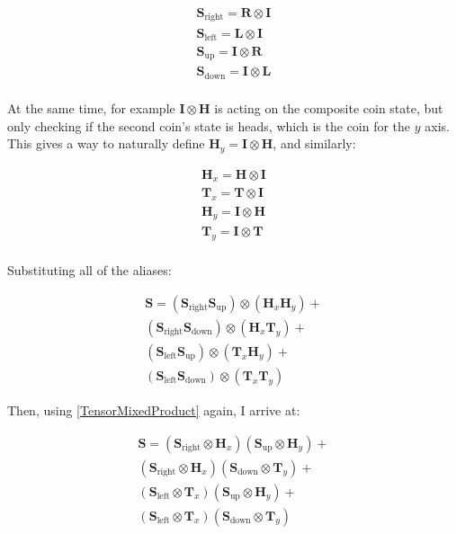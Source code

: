 \begin{align*} 
\mathbf{S}_{\text{right}} = \mathbf{R} \otimes \mathbf{I} \\
\mathbf{S}_{\text{left}} = \mathbf{L} \otimes \mathbf{I} \\
\mathbf{S}_{\text{up}} = \mathbf{I} \otimes \mathbf{R} \\
\mathbf{S}_{\text{down}} = \mathbf{I} \otimes \mathbf{L} \\
\end{align*}

At the same time, for example $\mathbf{I} \otimes \mathbf{H}$ is acting on the composite coin state, but only checking if the second coin's state is heads, which is the coin for the $y$ axis. This gives a way to naturally define $\mathbf{H}_y = \mathbf{I} \otimes \mathbf{H}$, and similarly:

\begin{align*} 
\mathbf{H}_x = \mathbf{H} \otimes \mathbf{I} \\
\mathbf{T}_x = \mathbf{T} \otimes \mathbf{I} \\
\mathbf{H}_y = \mathbf{I} \otimes \mathbf{H} \\
\mathbf{T}_y = \mathbf{I} \otimes \mathbf{T} \\
\end{align*}

Substituting all of the aliases:

\begin{align*} 
    \mathbf{S} =   
    (\mathbf{S}_{\text{right}}\mathbf{S}_{\text{up}}) \otimes (\mathbf{H}_x\mathbf{H}_y) + \\
    (\mathbf{S}_{\text{right}}\mathbf{S}_{\text{down}}) \otimes (\mathbf{H}_x\mathbf{T}_y) + \\
    (\mathbf{S}_{\text{left}}\mathbf{S}_{\text{up}}) \otimes (\mathbf{T}_x\mathbf{H}_y) + \\
    (\mathbf{S}_{\text{left}}\mathbf{S}_{\text{down}}) \otimes (\mathbf{T}_x\mathbf{T}_y)\phantom{+}
\end{align*}

Then, using \hyperref[TensorMixedProduct]{[TensorMixedProduct]} again, I arrive at:

\begin{align*} 
    \mathbf{S} =   
    (\mathbf{S}_{\text{right}} \otimes \mathbf{H}_x) (\mathbf{S}_{\text{up}} \otimes \mathbf{H}_y) + \\
    (\mathbf{S}_{\text{right}} \otimes \mathbf{H}_x) (\mathbf{S}_{\text{down}} \otimes \mathbf{T}_y) + \\
    (\mathbf{S}_{\text{left}} \otimes \mathbf{T}_x) (\mathbf{S}_{\text{up}} \otimes \mathbf{H}_y) + \\
    (\mathbf{S}_{\text{left}} \otimes \mathbf{T}_x) (\mathbf{S}_{\text{down}} \otimes \mathbf{T}_y)\phantom{+}
\end{align*}

